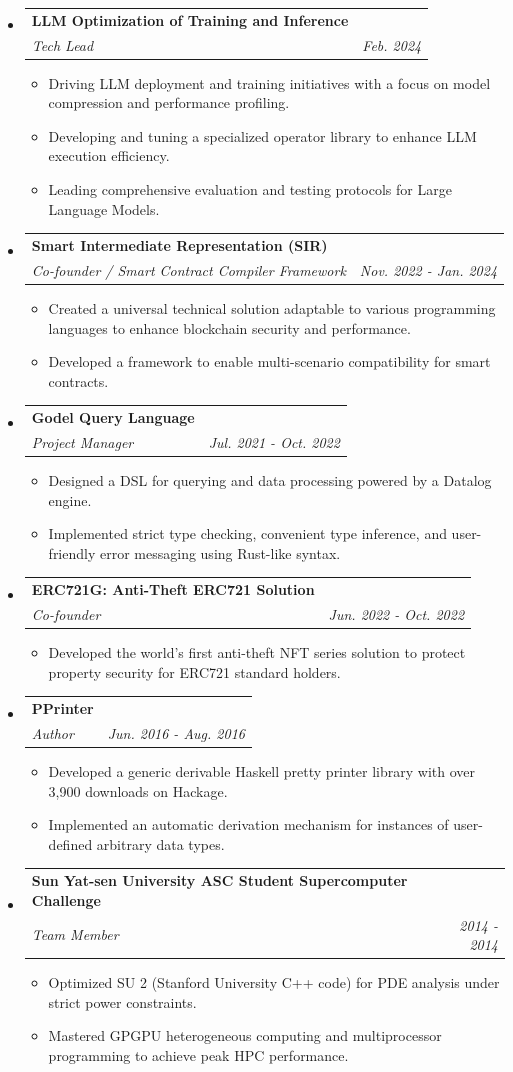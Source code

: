 \documentclass[letterpaper,11pt]{article}
\makeatletter
\newcommand{\resitem}[1]{\item #1 \vspace{-2pt}}
\newcommand{\ressubheading}[4]{
    \begin{tabular*}{6.5in}{p{4.8in}@{\extracolsep{\fill}}r}
            \textbf{#1} & #2 \\
            \textit{#3} & \textit{#4} \\
    \end{tabular*}\vspace{-8pt}}
\makeatother
\begin{document}
      \begin{itemize}
        \item \ressubheading{LLM Optimization of Training and Inference}{}{Tech Lead}{Feb. 2024}
        \begin{itemize}
            \resitem{Driving LLM deployment and training initiatives with a focus on model compression and performance profiling.}
            \resitem{Developing and tuning a specialized operator library to enhance LLM execution efficiency.}
            \resitem{Leading comprehensive evaluation and testing protocols for Large Language Models.}
        \end{itemize}
        \item \ressubheading{Smart Intermediate Representation (SIR)}{}{Co-founder / Smart Contract Compiler Framework}{Nov. 2022 - Jan. 2024}
        \begin{itemize}
            \resitem{Created a universal technical solution adaptable to various programming languages to enhance blockchain security and performance.}
            \resitem{Developed a framework to enable multi-scenario compatibility for smart contracts.}
        \end{itemize}
        \item \ressubheading{Godel Query Language}{}{Project Manager}{Jul. 2021 - Oct. 2022}
        \begin{itemize}
            \resitem{Designed a DSL for querying and data processing powered by a Datalog engine.}
            \resitem{Implemented strict type checking, convenient type inference, and user-friendly error messaging using Rust-like syntax.}
        \end{itemize}
        \item \ressubheading{ERC721G: Anti-Theft ERC721 Solution}{}{Co-founder}{Jun. 2022 - Oct. 2022}
        \begin{itemize}
            \resitem{Developed the world's first anti-theft NFT series solution to protect property security for ERC721 standard holders.}
        \end{itemize}
        \item \ressubheading{PPrinter}{}{Author}{Jun. 2016 - Aug. 2016}
        \begin{itemize}
            \resitem{Developed a generic derivable Haskell pretty printer library with over 3,900 downloads on Hackage.}
            \resitem{Implemented an automatic derivation mechanism for instances of user-defined arbitrary data types.}
        \end{itemize}
        \item \ressubheading{Sun Yat-sen University ASC Student Supercomputer Challenge}{}{Team Member}{2014 - 2014}
        \begin{itemize}
            \resitem{Optimized SU 2 (Stanford University C++ code) for PDE analysis under strict power constraints.}
            \resitem{Mastered GPGPU heterogeneous computing and multiprocessor programming to achieve peak HPC performance.}
        \end{itemize}
      \end{itemize}
\end{document}

